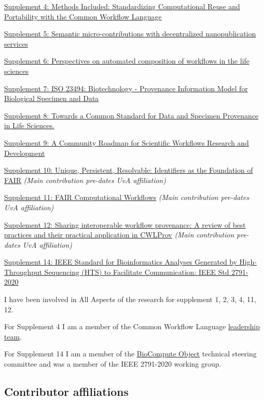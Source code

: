 \href{../methods-included/}{Supplement 4: Methods Included:
Standardizing Computational Reuse and Portability with the Common
Workflow Language}

\href{/2021/phd/nanopub/}{Supplement 5: Semantic micro-contributions
with decentralized nanopublication services}

\href{https://doi.org/10.12688/f1000research.54159.1}{Supplement 6:
Perspectives on automated composition of workflows in the life sciences}

\href{https://doi.org/10.1007/978-3-030-80960-7_16}{Supplement 7: ISO
23494: Biotechnology - Provenance Information Model for Biological
Specimen and Data}

\href{https://doi.org/10.5281/zenodo.5093125}{Supplement 8: Towards a
Common Standard for Data and Specimen Provenance in Life Sciences.}

\href{https://doi.org/10.1109/WORKS54523.2021.00016}{Supplement 9: A
Community Roadmap for Scientific Workflows Research and Development}

\href{https://doi.org/10.1162/dint_a_00025}{Supplement 10: Unique,
Persistent, Resolvable: Identifiers as the Foundation of FAIR}
\emph{(Main contribution pre-dates UvA affiliation)}

\href{https://doi.org/10.1162/dint_a_00033}{Supplement 11: FAIR
Computational Workflows} \emph{(Main contribution pre-dates UvA
affiliation)}

\href{https://doi.org/10.1093/gigascience/giz095}{Supplement 12: Sharing
interoperable workflow provenance: A review of best practices and their
practical application in CWLProv} \emph{(Main contribution pre-dates UvA
affiliation)}

\href{https://www.research.manchester.ac.uk/portal/en/publications/ieee-2791(936de52b-ac53-4f0e-9927-77fd7073e88d).html}{Supplement
14: IEEE Standard for Bioinformatics Analyses Generated by
High-Throughput Sequencing (HTS) to Facilitate Communication: IEEE Std
2791-2020}

I have been involved in All Aspects of the research for supplement 1, 2,
3, 4, 11, 12.

For Supplement 4 I am a member of the Common Workflow Language
\href{https://www.commonwl.org/governance/}{leadership team}.

For Supplement 14 I am a member of the
\href{https://www.biocomputeobject.org/}{BioCompute Object} technical
steering committee and was a member of the IEEE 2791-2020 working
group.

\hypertarget{contributor-affiliations}{%
\subsection{Contributor affiliations}\label{contributor-affiliations}}

